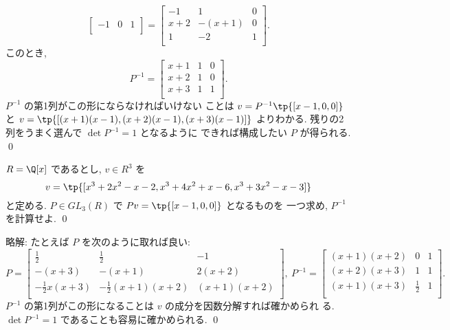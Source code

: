\documentclass[12pt,twoside]{jarticle}
\newcommand\commentout[1]{#1}
\newcommand\commentout[1]{}
\begin{document}
\begin{example}
\begin{equation*}
\begin{bmatrix}
      -1 & 0 & 1 \\
    \end{bmatrix}
    =
    \begin{bmatrix}
      -1  &   1    & 0 \\
      x+2 & -(x+1) & 0 \\
       1  &  -2    & 1 \\
    \end{bmatrix}.
  \end{equation*}
  このとき,
  \begin{equation*}
    P^{-1} =
    \begin{bmatrix}
      x+1 & 1 & 0 \\
      x+2 & 1 & 0 \\
      x+3 & 1 & 1 \\
    \end{bmatrix}.
  \end{equation*}
  $P^{-1}$ の第1列がこの形にならなければいけない
  ことは $v=P^{-1}\tp{[x-1,0,0]}$ 
  と $v=\tp{[(x+1)(x-1),(x+2)(x-1),(x+3)(x-1)]}$ よりわかる.  
  残りの2列をうまく選んで $\det P^{-1} = 1$ となるように
  できれば構成したい $P$ が得られる.
  \qed
\end{example}


\begin{question}
\label{q:Euclid-v-1}
  $R=\Q[x]$ であるとし, $v\in R^3$ を
  \begin{equation*}
    v=\tp{[x^3+2x^2-x-2,x^3+4x^2+x-6,x^3+3x^2-x-3]}
  \end{equation*}
  と定める.  
  $P\in GL_3(R)$ で $Pv = \tp{[x-1,0,0]}$ となるものを
  一つ求め, $P^{-1}$ を計算せよ. \qed
\end{question}

\commentout{
\noindent
略解: たとえば $P$ を次のように取れば良い:
{\small
\begin{equation*}
  P =
  \begin{bmatrix}
    \frac{1}{2} & \frac{1}{2} & -1 \\
    -(x+3)      & -(x+1)      & 2(x+2) \\
    -\frac{1}{2}x(x+3) & -\frac{1}{2}(x+1)(x+2) & (x+1)(x+2) \\
  \end{bmatrix},
  \ %
  P^{-1} = 
  \begin{bmatrix}
    (x+1)(x+2) & 0           & 1 \\
    (x+2)(x+3) & 1           & 1 \\
    (x+1)(x+3) & \frac{1}{2} & 1 \\
  \end{bmatrix}.
\end{equation*}
}$P^{-1}$ の第1列がこの形になることは $v$ の成分を因数分解すれば確かめられ
る.  $\det P^{-1}=1$ であることも容易に確かめられる.  \qed
}
\end{document}
